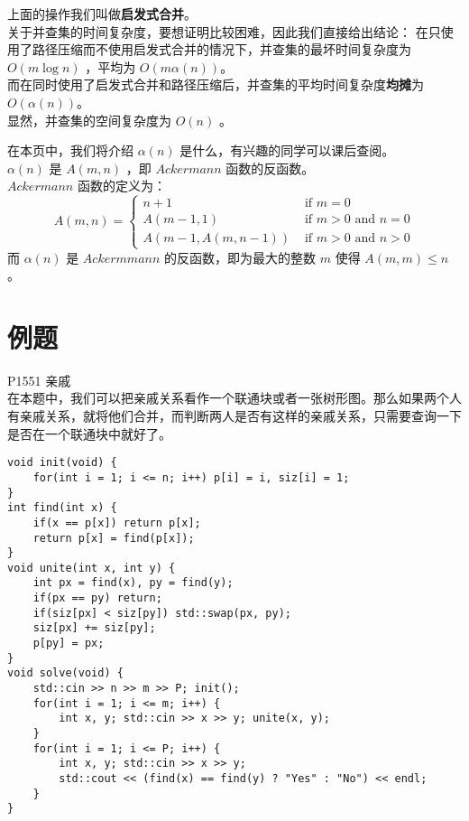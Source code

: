 \documentclass{beamer}
\newcommand{\fdf}[1]{\alert{\textbf{#1}}}
\begin{document}
\begin{frame}
上面的操作我们叫做\fdf{启发式合并}。\\ 
关于并查集的时间复杂度，要想证明比较困难，因此我们直接给出结论：
在只使用了路径压缩而不使用启发式合并的情况下，并查集的最坏时间复杂度为 $O(m \log n)$ ，平均为 $O(m \alpha(n))$。\\ 
而在同时使用了启发式合并和路径压缩后，并查集的平均时间复杂度\fdf{均摊}为$O(\alpha(n))$。 \\ 
显然，并查集的空间复杂度为 $O(n)$ 。
\end{frame}
\begin{frame}
在本页中，我们将介绍 $\alpha(n)$ 是什么，有兴趣的同学可以课后查阅。\\ 
$\alpha(n)$ 是 $A(m, n)$ ，即 $Ackermann$ 函数的反函数。 \\ 
$Ackermann$ 函数的定义为：
$$A(m, n) = \left\{\begin{array}{ll}
	n + 1 & \text { if } m = 0 \\
	A(m - 1, 1) & \text { if } m > 0 \text { and } n = 0 \\
	A(m - 1, A(m, n - 1)) & \text { if } m > 0 \text { and } n > 0
\end{array}\right.$$
而 $\alpha(n)$ 是 $Ackermmann$ 的反函数，即为最大的整数 $m$ 使得 $A(m, m) \leq n$ 。
\end{frame}
\section{例题}
\begin{frame}
P1551 亲戚\\ 
在本题中，我们可以把亲戚关系看作一个联通块或者一张树形图。那么如果两个人有亲戚关系，就将他们合并，而判断两人是否有这样的亲戚关系，只需要查询一下是否在一个联通块中就好了。
\end{frame}
\begin{frame}[fragile]
\begin{onlyenv}
\begin{verbatim}
void init(void) {
    for(int i = 1; i <= n; i++) p[i] = i, siz[i] = 1;
}
int find(int x) {
    if(x == p[x]) return p[x];
    return p[x] = find(p[x]);
}
void unite(int x, int y) {
    int px = find(x), py = find(y);
    if(px == py) return;
    if(siz[px] < siz[py]) std::swap(px, py);
    siz[px] += siz[py];
    p[py] = px;
}
void solve(void) {
    std::cin >> n >> m >> P; init();
    for(int i = 1; i <= m; i++) {
        int x, y; std::cin >> x >> y; unite(x, y);
    }
    for(int i = 1; i <= P; i++) {
        int x, y; std::cin >> x >> y;
        std::cout << (find(x) == find(y) ? "Yes" : "No") << endl;
    }
}
\end{verbatim}
\end{onlyenv}
\end{frame}
\end{document}

